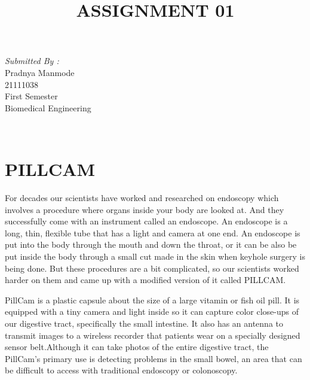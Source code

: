 \documentclass[12pt]{article}
\begin{document}
\begin{titlepage}
\begin{minipage}{0.4\textwidth}
			\begin{flushright} \large
			\emph{Submitted By :} \\
			Pradnya Manmode\\
            21111038\\
        First Semester\\
        Biomedical Engineering\\
		\end{flushright}
        
	\end{minipage}\\[2 cm]
	
	
    
    
    
    
	
\end{titlepage}


\title{ASSIGNMENT 01}
\maketitle

\section{PILLCAM}

For decades our scientists have worked and researched on endoscopy which involves a procedure where organs inside your body are looked at. And they successfully come with an instrument called an endoscope. An endoscope is a long, thin, flexible tube that has a light and camera at one end. An endoscope is put into the body through the mouth and down the throat, or it can be also be put inside the body through a small cut made in the skin when keyhole surgery is being done. But these procedures are a bit complicated, so our scientists worked harder on them and came up with a modified version of it called PILLCAM.

\indent

PillCam is a plastic capsule about the size of a large vitamin or fish oil pill. It is equipped with a tiny camera and light inside so it can capture color close-ups of our digestive tract, specifically the small intestine. It also has an antenna to transmit images to a wireless recorder that patients wear on a specially designed sensor belt.Although it can take photos of the entire digestive tract, the PillCam’s primary use is detecting problems in the small bowel, an area that can be difficult to access with traditional endoscopy or colonoscopy.
\end{document}
